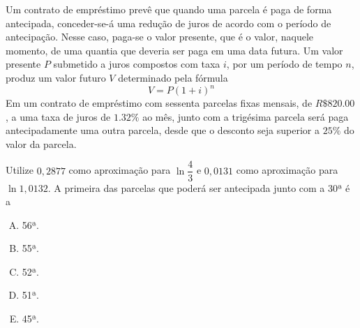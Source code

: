 \documentclass{book}
\theoremstyle{definition}
\theoremstyle{remark}
\theoremstyle{plain}
\theoremstyle{plain}
\theoremstyle{plain}
\theoremstyle{plain}
\begin{document}
        \begin{Exercise}[origin={ENEM 2019, adaptado}]
            Um contrato de empréstimo prevê que quando uma parcela é paga de forma antecipada, conceder-se-á uma redução 
            de juros de acordo com o período de antecipação. Nesse caso, paga-se o valor presente, que é o valor, naquele 
            momento, de uma quantia que deveria ser paga em uma data futura. Um valor presente $P$ submetido a juros compostos 
            com taxa $i$, por um período de tempo $n$, produz um valor futuro $V$ determinado pela fórmula
            $$V = P(1+i)^n$$
            Em um contrato de empréstimo com sessenta parcelas fixas mensais, de $R\$ \num{820.00}$, a uma taxa de juros
            de $\num{1.32}\%$ ao mês, junto com a trigésima parcela será paga antecipadamente uma outra parcela, 
            desde que o desconto seja superior a $25\%$ do valor da parcela.

            Utilize $0,2877$ como aproximação para $\ln \dfrac{4}{3}$ e $0,0131$ como aproximação 
            para $\ln 1,0132$. 
            A primeira das parcelas que poderá ser antecipada junto com a 30ª é a

            \begin{enumerate}[A)]
                \item 56ª.
                \item 55ª.
                \item 52ª.
                \item 51ª.
                \item 45ª.
            \end{enumerate}
        \end{Exercise}
\end{document}
